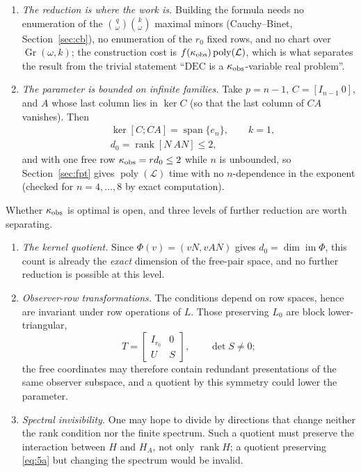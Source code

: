 \begin{enumerate}
\item \emph{The reduction is where the work is.} Building the formula needs no enumeration of the $\binom q\omega\binom k\omega$ maximal minors (Cauchy--Binet, Section~\ref{sec:cb}), no enumeration of the $r_0$ fixed rows, and no chart over $\operatorname{Gr}(\omega,k)$; the construction cost is $f(\kappa_{\rm obs})\operatorname{poly}(\mathcal L)$, which is what separates the result from the trivial statement ``$\mathrm{DEC}$ is a $\kappa_{\rm obs}$-variable real problem''.
\item \emph{The parameter is bounded on infinite families.} Take $p=n-1$, $C=[I_{n-1}\ 0]$, and $A$ whose last column lies in $\ker C$ (so that the last column of $CA$ vanishes). Then
\begin{equation*}
\begin{aligned}
&\ker[C;CA]=\operatorname{span}\{e_n\},\qquad k=1,\\
&d_0=\operatorname{rank}[N\ AN]\le2,
\end{aligned}
\end{equation*}
and with one free row $\kappa_{\rm obs}=r d_0\le2$ while $n$ is unbounded, so Section~\ref{sec:fpt} gives $\operatorname{poly}(\mathcal L)$ time with no $n$-dependence in the exponent (checked for $n=4,\dots,8$ by exact computation).
\end{enumerate}

Whether $\kappa_{\rm obs}$ is optimal is open, and three levels of further reduction are worth separating.

\begin{enumerate}
\item \emph{The kernel quotient.} Since $\Phi(v)=(vN,vAN)$ gives $d_0=\dim\operatorname{im}\Phi$, this count is already the \emph{exact} dimension of the free-pair space, and no further reduction is possible at this level.
\item \emph{Observer-row transformations.} The conditions depend on row spaces, hence are invariant under row operations of $L$. Those preserving $L_0$ are block lower-triangular,
\begin{equation*}
T=\begin{bmatrix}I_{r_0}&0\\ U&S\end{bmatrix},\qquad \det S\ne0;
\end{equation*}
the free coordinates may therefore contain redundant presentations of the same observer subspace, and a quotient by this symmetry could lower the parameter.
\item \emph{Spectral invisibility.} One may hope to divide by directions that change neither the rank condition nor the finite spectrum. Such a quotient must preserve the interaction between $H$ and $H_A$, not only $\operatorname{rank}H$; a quotient preserving \eqref{eq:5a} but changing the spectrum would be invalid.
\end{enumerate}

